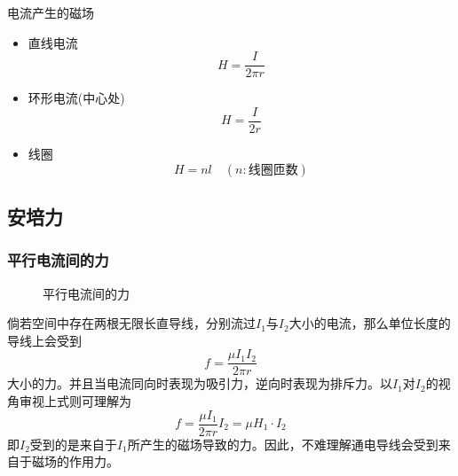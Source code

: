 \begin{itembox}[l]{电流产生的磁场}
    \begin{itemize}
        \item 直线电流
        \begin{equation*}
            H=\frac{I}{2\pi r}
        \end{equation*}
        \item 环形电流(中心处)
        \begin{equation*}
            H=\frac{I}{2r}
        \end{equation*}
        \item 线圈
        \begin{equation*}
            H=nl\quad(n:\textrm{线圈匝数})
        \end{equation*}
    \end{itemize}
\end{itembox}

\subsection{安培力}

\subsubsection{平行电流间的力}

\begin{figure}[ht!]
    \centering
    \caption{平行电流间的力}
\end{figure}
倘若空间中存在两根无限长直导线，分别流过$I_1$与$I_2$大小的电流，那么单位长度的导线上会受到
\begin{equation*}
    f=\frac{\mu I_1I_2}{2\pi r}
\end{equation*}
大小的力。并且当电流同向时表现为吸引力，逆向时表现为排斥力。以$I_1$对$I_2$的视角审视上式则可理解为
\begin{equation*}
    f=\frac{\mu I_1}{2\pi r}I_2=\mu H_1\cdot I_2
\end{equation*}
即$I_2$受到的是来自于$I_1$所产生的磁场导致的力。因此，不难理解通电导线会受到来自于磁场的作用力。

